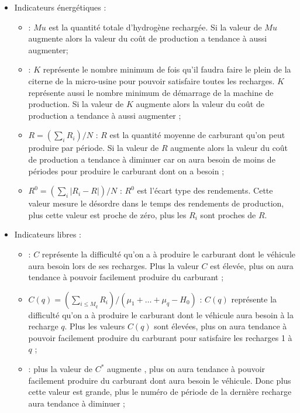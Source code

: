 \begin{itemize}[label=$\square$]
\item	Indicateurs énergétiques :
\begin{itemize}
\item	{} : $Mu$ est la quantité totale d'hydrogène rechargée. Si la valeur de $Mu$ augmente alors la valeur du coût de production a tendance à aussi augmenter;
\item	{} : $K$ représente le nombre minimum de fois qu'il faudra faire le plein de la citerne de la micro-usine pour pouvoir satisfaire toutes les recharges. $K$ représente aussi le nombre minimum de démarrage de la machine de production. Si la valeur de $K$ augmente alors la valeur du coût de production a tendance à aussi augmenter ;
\item	$R = (\sum_i R_i)/N$ : $R$ est la quantité moyenne de carburant qu'on peut produire par période. Si la valeur de $R$ augmente alors la valeur du coût de production a tendance à diminuer car on aura besoin de moins de périodes pour produire le carburant dont on a besoin ;
\item $R^0 = (\sum_i |R_i- R|)/N$ : $R^0$ est l'écart type des rendements. Cette valeur mesure le désordre dans le temps des rendements de production, plus cette valeur est proche de zéro, plus les $R_i$ sont proches de $R$. %
\end{itemize}
\item	Indicateurs libres :
\begin{itemize}
\item	{} : $C$ représente la difficulté qu'on a à produire le carburant dont le véhicule aura besoin lors de ses recharges. Plus la valeur $C$ est élevée, plus on aura tendance à pouvoir facilement produire du carburant ;
\item	$C(q) = (\sum_{i \leq M_q} R_i)/(\mu_1 + \dots + \mu_q - H_0)$ : $C(q)$ représente la difficulté qu'on a à produire le carburant dont le véhicule aura besoin à la recharge $q$. Plus les valeurs $C(q)$ sont élevées, plus on aura tendance à pouvoir facilement produire du carburant pour satisfaire les recharges 1 à $q$ ;
\item	{} : plus la valeur de $C^*$ augmente , plus on aura tendance à pouvoir facilement produire du carburant dont aura besoin le véhicule. Donc plus cette valeur est grande, plus le numéro de période de la dernière recharge aura tendance à diminuer ;
\end{itemize}


\end{itemize}
